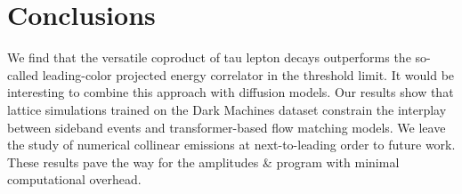 \section{Conclusions}\label{sec:conclusions}

We find that the versatile coproduct of tau lepton decays outperforms
the so-called leading-color projected energy correlator in the threshold
limit. It would be interesting to combine this approach with diffusion
models. Our results show that lattice simulations trained on the Dark
Machines dataset constrain the interplay between sideband events and
transformer-based flow matching models. We leave the study of numerical
collinear emissions at next-to-leading order to future work. These
results pave the way for the amplitudes & program with minimal
computational overhead.

